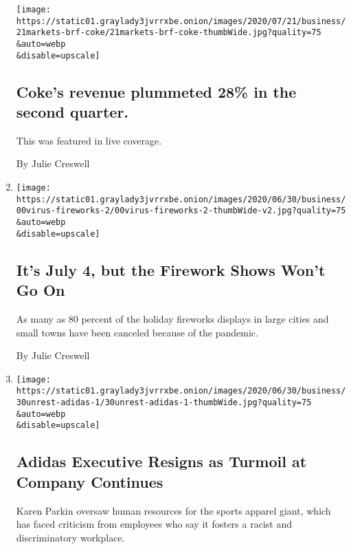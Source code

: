 \begin{enumerate}
  \texttt{[image: https://static01.graylady3jvrrxbe.onion/images/2020/07/21/business/21markets-brf-coke/21markets-brf-coke-thumbWide.jpg?quality=75\\\&auto=webp\\\&disable=upscale]}

  \hypertarget{cokes-revenue-plummeted-28-in-the-second-quarter}{%
  \subsection{Coke's revenue plummeted 28\% in the second
  quarter.}\label{cokes-revenue-plummeted-28-in-the-second-quarter}}

  This was featured in live coverage.

  By Julie Creswell
\item
  \href{/2020/07/01/business/fourth-of-july-fireworks-displays.html}{}

  \texttt{[image: https://static01.graylady3jvrrxbe.onion/images/2020/06/30/business/00virus-fireworks-2/00virus-fireworks-2-thumbWide-v2.jpg?quality=75\\\&auto=webp\\\&disable=upscale]}

  \hypertarget{its-july-4-but-the-firework-shows-wont-go-on}{%
  \subsection{It's July 4, but the Firework Shows Won't Go
  On}\label{its-july-4-but-the-firework-shows-wont-go-on}}

  As many as 80 percent of the holiday fireworks displays in large
  cities and small towns have been canceled because of the pandemic.

  By Julie Creswell
\item
  \href{/2020/06/30/business/adidas-karen-parkin-resigns.html}{}

  \texttt{[image: https://static01.graylady3jvrrxbe.onion/images/2020/06/30/business/30unrest-adidas-1/30unrest-adidas-1-thumbWide.jpg?quality=75\\\&auto=webp\\\&disable=upscale]}

  \hypertarget{adidas-executive-resigns-as-turmoil-at-company-continues}{%
  \subsection{Adidas Executive Resigns as Turmoil at Company
  Continues}\label{adidas-executive-resigns-as-turmoil-at-company-continues}}

  Karen Parkin oversaw human resources for the sports apparel giant,
  which has faced criticism from employees who say it fosters a racist
  and discriminatory workplace.


\end{enumerate}
